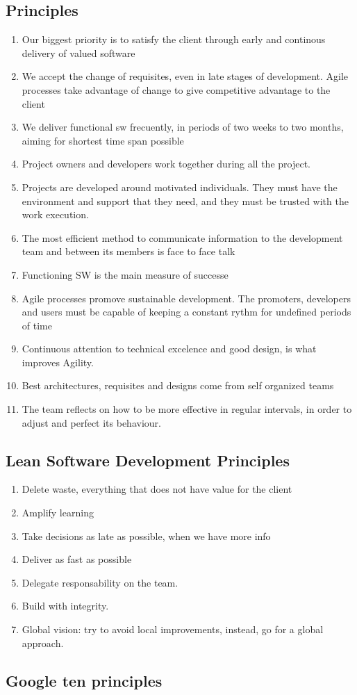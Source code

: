 \documentclass[a4paper,12pt] {article}
\begin{document}
\subsection{Principles}
\begin{enumerate}
\item Our biggest priority is to satisfy the client through early and continous delivery of valued software
\item We accept the change of requisites, even in late stages of development. Agile processes take advantage of change to give competitive advantage to the client
\item We deliver functional sw frecuently, in periods of two weeks to two months, aiming for shortest time span possible
\item Project owners and developers work together during all the project.
\item Projects are developed around motivated individuals. They must have the environment and support that they need, and they must be trusted with the work execution.
\item The most efficient method to communicate information to the development team and between its members is face to face talk
\item Functioning SW is the main measure of successe
\item Agile processes promove sustainable development. The promoters, developers and users must be capable of keeping a constant rythm for undefined periods of time
\item Continuous attention to technical excelence and good design, is what improves Agility.
\item Best architectures, requisites and designs come from self organized teams
\item The team reflects on how to be more effective in regular intervals, in order to adjust and perfect its behaviour.

\end{enumerate}

\subsection{Lean Software Development Principles}

\begin{enumerate}
\item Delete waste, everything that does not have value for the client
\item Amplify learning
\item Take decisions as late as possible, when we have more info
\item Deliver as fast as possible
\item Delegate responsability on the team.
\item Build with integrity.
\item Global vision: try to avoid local improvements, instead, go for a global approach.

\end{enumerate}

\subsection{Google ten principles}
\end{document}
